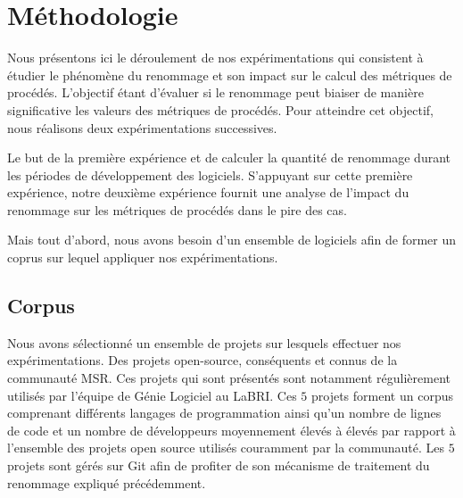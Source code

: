 \section{Méthodologie}
\label{sec:methodologie}

Nous présentons ici le déroulement de nos expérimentations qui consistent à étudier le phénomène du renommage et son impact sur le calcul des métriques de procédés. L’objectif étant d’évaluer si le renommage peut biaiser de manière significative les valeurs des métriques de procédés. Pour atteindre cet objectif, nous réalisons deux expérimentations successives.

Le but de la première expérience et de calculer la quantité de renommage durant les périodes de développement des logiciels. S’appuyant sur cette première expérience, notre deuxième expérience fournit une analyse de l’impact du renommage sur les métriques de procédés dans le pire des cas. 

Mais tout d'abord, nous avons besoin d'un ensemble de logiciels afin de former un coprus sur lequel appliquer nos expérimentations. 

\subsection{Corpus}

Nous avons sélectionné un ensemble de projets sur lesquels effectuer nos expérimentations. Des projets open-source, conséquents et connus de la communauté MSR. Ces projets qui sont présentés  sont notamment régulièrement utilisés par l'équipe de Génie Logiciel au LaBRI. Ces $5$ projets forment un corpus comprenant différents langages de programmation ainsi qu'un nombre de lignes de code et un nombre de développeurs moyennement élevés à élevés par rapport à l'ensemble des projets open source utilisés couramment par la communauté. Les $5$ projets sont gérés sur Git afin de profiter de son mécanisme de traitement du renommage expliqué précédemment. \\


